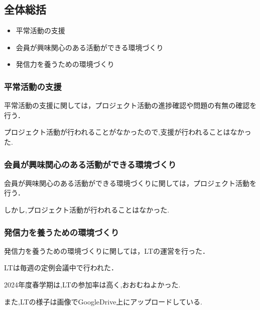 \subsection*{全体総括}


\begin{itemize}
    \item 平常活動の支援
    \item 会員が興味関心のある活動ができる環境づくり
    \item 発信力を養うための環境づくり
  \end{itemize}
  
  \subsubsection*{平常活動の支援}
  平常活動の支援に関しては，プロジェクト活動の進捗確認や問題の有無の確認を行う．
  
  プロジェクト活動が行われることがなかったので,支援が行われることはなかった.
  
  \subsubsection*{会員が興味関心のある活動ができる環境づくり}
  会員が興味関心のある活動ができる環境づくりに関しては，プロジェクト活動を行う．

  しかし,プロジェクト活動が行われることはなかった.
  
  \subsubsection*{発信力を養うための環境づくり}
  発信力を養うための環境づくりに関しては，LTの運営を行った．
  
  LTは毎週の定例会議中で行われた．
  
  2024年度春学期は,LTの参加率は高く,おおむねよかった.
  
  また,LTの様子は画像でGoogleDrive上にアップロードしている.
  